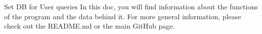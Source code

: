 Set DB for User queries In this doc, you will find information about the functions of the program and the data behind it. For more general information, please check out the R\+E\+A\+D\+M\+E.\+md or the main Git\+Hub page. 